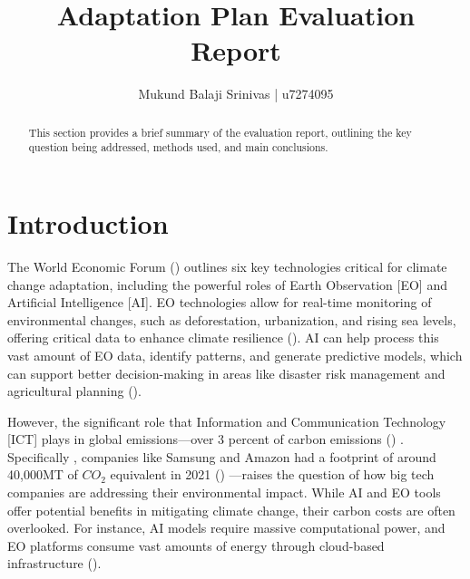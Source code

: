 \documentclass[12pt]{article}
\title{Adaptation Plan Evaluation Report}
\author{Mukund Balaji Srinivas | u7274095}
\date{} %
\begin{document}
\maketitle

\begin{abstract}
This section provides a brief summary of the evaluation report, outlining the key question being addressed, methods used, and main conclusions.
\end{abstract}

\newpage

\section*{Introduction}

The World Economic Forum (\cite{masterson_2024})  outlines six key technologies critical for climate change adaptation, including the powerful roles of Earth Observation [EO] and Artificial Intelligence [AI]. EO technologies allow for real-time monitoring of environmental changes, such as deforestation, urbanization, and rising sea levels, offering critical data to enhance climate resilience (\cite{anderson_2017}). AI can help process this vast amount of EO data, identify patterns, and generate predictive models, which can support better decision-making in areas like disaster risk management and agricultural planning (\cite{Huntingford_2019}).

However, the significant role that Information and Communication Technology [ICT] 
plays in global emissions—over 3 percent of carbon emissions (\cite{jones_2018}) . Specifically , 
companies like Samsung and Amazon had a footprint of around 40,000MT of \(CO_2\) equivalent in 2021 (\cite{navarro_2023_the}) —raises the question of how big tech companies are addressing their environmental impact. While AI and EO tools offer potential benefits in mitigating climate change, their carbon costs are often overlooked. For instance, AI models require massive computational power, and EO platforms consume vast amounts of energy through cloud-based infrastructure (\cite{taddeo_2021}).
\end{document}
